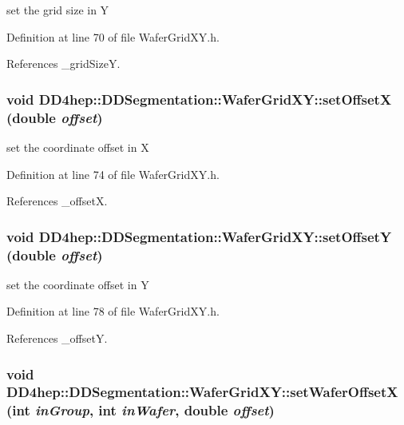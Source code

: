 set the grid size in Y 

Definition at line 70 of file WaferGridXY.h.

References \_\-gridSizeY.\hypertarget{class_d_d4hep_1_1_d_d_segmentation_1_1_wafer_grid_x_y_a7721c7a200c1893f1badcbc78e1319d8}{
\subsubsection[{setOffsetX}]{\setlength{\rightskip}{0pt plus 5cm}void DD4hep::DDSegmentation::WaferGridXY::setOffsetX (double {\em offset})}}
\label{class_d_d4hep_1_1_d_d_segmentation_1_1_wafer_grid_x_y_a7721c7a200c1893f1badcbc78e1319d8}


set the coordinate offset in X 

Definition at line 74 of file WaferGridXY.h.

References \_\-offsetX.\hypertarget{class_d_d4hep_1_1_d_d_segmentation_1_1_wafer_grid_x_y_a0db51fa22c800ca21f6c6c18b0740012}{
\subsubsection[{setOffsetY}]{\setlength{\rightskip}{0pt plus 5cm}void DD4hep::DDSegmentation::WaferGridXY::setOffsetY (double {\em offset})}}
\label{class_d_d4hep_1_1_d_d_segmentation_1_1_wafer_grid_x_y_a0db51fa22c800ca21f6c6c18b0740012}


set the coordinate offset in Y 

Definition at line 78 of file WaferGridXY.h.

References \_\-offsetY.\hypertarget{class_d_d4hep_1_1_d_d_segmentation_1_1_wafer_grid_x_y_a95441c0bdca2bd9d72f5711a98bbec83}{
\subsubsection[{setWaferOffsetX}]{\setlength{\rightskip}{0pt plus 5cm}void DD4hep::DDSegmentation::WaferGridXY::setWaferOffsetX (int {\em inGroup}, \/  int {\em inWafer}, \/  double {\em offset})}}
\label{class_d_d4hep_1_1_d_d_segmentation_1_1_wafer_grid_x_y_a95441c0bdca2bd9d72f5711a98bbec83}


